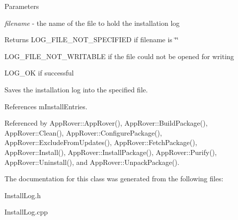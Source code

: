 \begin{DoxyParams}{Parameters}
\item[{\em filename}]-\/ the name of the file to hold the installation log \end{DoxyParams}
\begin{DoxyReturn}{Returns}
LOG\_\-FILE\_\-NOT\_\-SPECIFIED if filename is \char`\"{}\char`\"{} 

LOG\_\-FILE\_\-NOT\_\-WRITABLE if the file could not be opened for writing 

LOG\_\-OK if successful
\end{DoxyReturn}
Saves the installation log into the specified file. 

References mInstallEntries.



Referenced by AppRover::AppRover(), AppRover::BuildPackage(), AppRover::Clean(), AppRover::ConfigurePackage(), AppRover::ExcludeFromUpdates(), AppRover::FetchPackage(), AppRover::Install(), AppRover::InstallPackage(), AppRover::Purify(), AppRover::Uninstall(), and AppRover::UnpackPackage().



The documentation for this class was generated from the following files:\begin{DoxyCompactItemize}
\item 
InstallLog.h\item 
InstallLog.cpp\end{DoxyCompactItemize}

